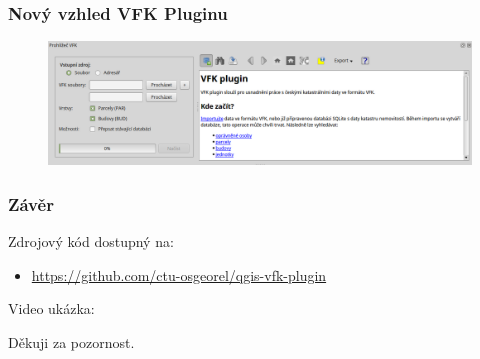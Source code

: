\documentclass{beamer}
\begin{document}
\begin{frame}
\frametitle{Nový vzhled VFK Pluginu}

\begin{figure}
  \includegraphics[width=1\textwidth]{images/vfkPlugin-novy_vzhled.png}
\end{figure}
\end{frame}


\begin{frame}
\frametitle{Závěr}

Zdrojový kód dostupný na: 
\begin{itemize}
 \item \url{https://github.com/ctu-osgeorel/qgis-vfk-plugin}
\end{itemize}


Video ukázka:
\vspace{6pt}

\centering
{}

\end{frame}


\begin{frame}
\Huge{\centerline{Děkuji za pozornost.}}
\end{frame}


% 
% 
% 
% 


\end{document}
